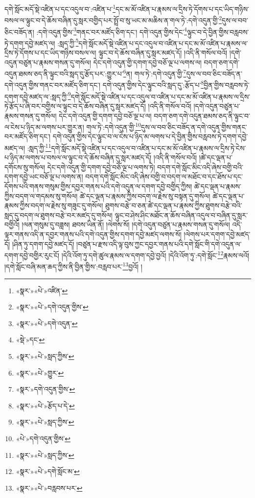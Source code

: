 དགེ་སློང་མདོ་སྡེ་འཛིན་པ་དང་འདུལ་བ་:འཛིན་པ་\footnote{«སྣར་»«པེ་»འཛིན་}དང་མ་མོ་འཛིན་པ་རྣམས་ལ་དྲིས་ཏེ་དོགས་པ་དང་ཡིད་གཉིས་བསལ་ལ་ལྟུང་བ་དེ་ཆོས་བཞིན་དུ་སླར་བགྱིད་པར་སྤྲོ་བ་སུ་ཡང་མ་མཆིས་ན་གལ་ཏེ་:དགེ་འདུན་གྱི་\footnote{«སྣར་»«པེ་»དགེ་འདུན་གྱིས་}དུས་ལ་བབ་ཅིང་བཟོད་ན། :དགེ་འདུན་གྱིས་\footnote{«སྣར་»«པེ་»དགེ་འདུན་}གནང་བར་མཛོད་ཅིག་དང་། དགེ་འདུན་གྱིས་དེང་\footnote{«སྡེ་»དང་}ལྟུང་བ་དེ་བྱིན་གྱིས་བརླབས་ཏེ་དགག་དབྱེ་མཛད་ལ། :སླད་ཀྱི་\footnote{«སྣར་»«པེ་»སླད་ཀྱིས་}དགེ་སློང་མདོ་སྡེ་འཛིན་པ་དང་འདུལ་བ་འཛིན་པ་དང་མ་མོ་འཛིན་པ་རྣམས་ལ་དྲིས་ཏེ་དོགས་པ་དང་ཡིད་གཉིས་བསལ་ལ། ལྟུང་བ་དེ་ཆོས་བཞིན་དུ་སླར་མཛད་དོ། །འདི་ནི་གསོལ་བའོ། །དགེ་འདུན་བཙུན་པ་རྣམས་གསན་དུ་གསོལ། དེང་དགེ་འདུན་གྱི་དགག་དབྱེ་བཅོ་ལྔ་པ་ལགས་ལ། བདག་ཅག་དགེ་འདུན་ཐམས་ཅད་ནི་ལྟུང་བའི་སླད་དུ་རྩོད་པར་:གྱུར་པ་\footnote{«སྣར་»«པེ་»གྱུར་}ན། གལ་ཏེ་:དགེ་འདུན་གྱི་\footnote{«སྣར་»དགེ་འདུན་གྱིས་}དུས་ལ་བབ་ཅིང་བཟོད་ན་དགེ་འདུན་གྱིས་གནང་བར་མཛོད་ཅིག་དང་། དགེ་འདུན་གྱིས་དེང་ལྟུང་བའི་སླད་དུ་:རྩོད་པ་\footnote{«སྣར་»«པེ་»རྩོད་པ་དེ་}བྱིན་གྱིས་བརླབས་ཏེ་དགག་དབྱེ་མཛད་ལ་:སླད་ཀྱི་\footnote{«སྣར་»«པེ་»སླད་ཀྱིས་}དགེ་སློང་མདོ་སྡེ་འཛིན་པ་དང་འདུལ་བ་འཛིན་པ་དང་མ་མོ་འཛིན་པ་རྣམས་ལ་དྲིས་ཏེ་རྩོད་པ་ཞི་བར་བགྱིས་ལ་ལྟུང་བ་དེ་ཆོས་བཞིན་དུ་སླར་མཛད་དོ། །འདི་ནི་གསོལ་བའོ། །དགེ་འདུན་བཙུན་པ་རྣམས་གསན་དུ་གསོལ། དེང་དགེ་འདུན་གྱི་དགག་དབྱེ་བཅོ་ལྔ་པ་ལ། བདག་ཅག་དགེ་འདུན་ཐམས་ཅད་ནི་ལྟུང་བ་ལ་ངེས་པ་ཉིད་མ་ལགས་པར་གྱུར་ན། གལ་ཏེ་:དགེ་འདུན་གྱི་\footnote{«པེ་»དགེ་འདུན་གྱིས་}དུས་ལ་བབ་ཅིང་བཟོད་ན་དགེ་འདུན་གྱིས་གནང་བར་མཛོད་ཅིག་དང་། དགེ་འདུན་གྱིས་དེང་ལྟུང་བ་ལ་ངེས་པ་ཉིད་མ་ལགས་པ་དེ་བྱིན་གྱིས་བརླབས་ཏེ་དགག་དབྱེ་མཛད་ལ། :སླད་ཀྱི་\footnote{«སྣར་»«པེ་»སླད་ཀྱིས་}དགེ་སློང་མདོ་སྡེ་འཛིན་པ་དང་འདུལ་བ་འཛིན་པ་དང་མ་མོ་འཛིན་པ་རྣམས་ལ་དྲིས་ཏེ་ངེས་པ་ཉིད་མ་ལགས་པ་བསལ་ལ་ལྟུང་བ་དེ་ཆོས་བཞིན་དུ་སླར་མཛད་དོ། །འདི་ནི་གསོལ་བའོ། །ཚེ་དང་ལྡན་པ་དགོངས་སུ་གསོལ། དེང་དགེ་འདུན་གྱི་དགག་དབྱེ་བཅོ་ལྔ་པ་ལགས་ཏེ། བདག་དགེ་སློང་མིང་འདི་ཞེས་བགྱི་བའི་དགག་དབྱེ་ཡང་བཅོ་ལྔ་པ་ལགས་ན། བདག་དགེ་སློང་མིང་འདི་ཞེས་བགྱི་བ་བདག་ལ་མཐོང་བ་དང་ཐོས་པ་དང་དོགས་པའི་གནས་གསུམ་གྱིས་དབྱར་གནས་པའི་དགེ་འདུན་ལ་དགག་དབྱེ་བགྱིད་ཀྱིས། ཚེ་དང་ལྡན་པ་རྣམས་ཀྱིས་བདག་ལ་གདམས་སུ་གསོལ། ཚེ་དང་ལྡན་པ་རྣམས་ཀྱིས་བདག་ལ་རྗེས་སུ་བསྟན་དུ་གསོལ། ཚེ་དང་ལྡན་པ་རྣམས་ཀྱིས་བདག་ལ་རྗེས་སུ་གཟུང་དུ་གསོལ། ཐུགས་བརྩེ་བ་ཅན་ཚེ་དང་ལྡན་པ་རྣམས་ཀྱིས་ཐུགས་བརྩེ་བའི་སླད་དུ་བདག་ལ་ཐུགས་བརྩེ་བར་མཛད་དུ་གསོལ། ལྟུང་བ་ཤེས་ཤིང་མཐོང་ན་ཆོས་བཞིན་འདུལ་བ་བཞིན་དུ་སླར་བགྱིའོ། །ལན་གསུམ་དུ་བཟླས། ཐབས་ཡིན་ནོ། །ལེགས་སོ། །དགེ་འདུན་བཙུན་པ་རྣམས་གསན་དུ་གསོལ། འདི་ལྟར་གནས་འདི་ན་དབྱར་གནས་པའི་དགེ་འདུན་གྱིས་དགག་དབྱེ་མཛད་ལགས་སོ། །ལེགས་པར་དགག་དབྱེ་མཛད་དོ། །ཤིན་ཏུ་དགག་དབྱེ་མཛད་དོ། །བཙུན་པ་རྫས་འདི་ལྟ་བུས་ཀྱང་དབྱར་གནས་པའི་དགེ་སློང་གི་དགེ་འདུན་ལ་དགག་དབྱེ་བགྱིར་རུང་ངོ། །དེའི་འོག་ཏུ་དགེ་ཚུལ་རྣམས་ལ་དགག་དབྱེ་བྱའོ། །དེའི་འོག་ཏུ་:དགེ་སློང་\footnote{«སྣར་»«པེ་»དགེ་སློང་མ་}རྣམས་ལའོ། །དགེ་སློང་བཞི་མན་ཆད་ཀྱིས་ནི་བྱིན་གྱིས་:བརླབ་པར་\footnote{«སྣར་»«པེ་»བརླབས་པར་}བྱའོ། །
